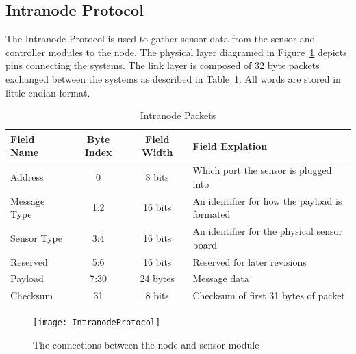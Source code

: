 		\subsection{Intranode Protocol}
			The Intranode Protocol is used to gather sensor data from the sensor and controller modules to the node. The physical layer diagramed in Figure~\ref{fig:IntranodePhysical} depicts pins connecting the systems. The link layer is composed of 32 byte packets exchanged between the systems as described in Table~\ref{tab:IntranodeLink}. All words are stored in little-endian format.
			\begin{table}[h!]
				\centering
				\caption{Intranode Packets}
				\label{tab:IntranodeLink}
				\begin{tabular}{l c c l}
					\toprule[1.2pt]
					Field Name & Byte Index & Field Width & Field Explation\\ \hline
					Address & 0 & 8 bits & Which port the sensor is plugged into\\
					Message Type & 1:2 & 16 bits & An identifier for how the payload is formated\\
					Sensor Type & 3:4 & 16 bits & An identifier for the physical sensor board\\
					Reserved & 5:6 & 16 bits & Reserved for later revisions\\
					Payload & 7:30 & 24 bytes & Message data\\
					Checksum & 31 & 8 bits & Checksum of first 31 bytes of packet\\ \bottomrule[1.2pt]
				\end{tabular}
			\end{table}
			
			\begin{figure}[h!]
				\centering
				\texttt{[image: IntranodeProtocol]}
				\caption{The connections between the node and sensor module}
				\label{fig:IntranodePhysical}
			\end{figure}
	
